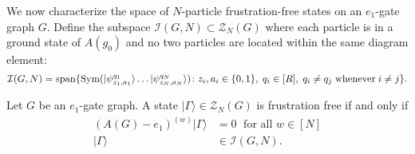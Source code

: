 \documentclass[../thesis-main/thesis-main]{subfiles}
\begin{document}
We now characterize the space of $N$-particle frustration-free states on an $e_{1}$-gate graph $G$. Define the subspace $\mathcal{I}(G,N)\subset\mathcal{Z}_{N}(G)$ where each particle is in a ground state of $A(g_{0})$ and no two particles are located within the same diagram element: 
\begin{equation}
  \mathcal{I}(G,N)=\operatorname{span}\{
  \operatorname{Sym}(|\psi_{z_{1},a_{1}}^{q_{1}}\rangle
  \ldots|\psi_{z_{N},a_{N}}^{q_{N}}\rangle)\colon 
  z_{i},a_{i}\in\{0,1\},\; q_{i}\in[R],\; 
  q_{i}\neq q_{j}\;\text{whenever}\; i\neq j\}.\label{eq:Ign}
\end{equation}

\begin{lemma}\label{lem:FF_characterization}
Let $G$ be an $e_{1}$-gate graph. A state $|\Gamma\rangle\in\mathcal{Z}_{N}(G)$ is frustration free if and only if 
\begin{align}
\left(A(G)-e_{1}\right)^{(w)}|\Gamma\rangle & =0\;\text{ for all }w\in[N]\label{eq:ff_condition1}\\
|\Gamma\rangle & \in\mathcal{I}(G,N).\label{eq:ff_condition2}
\end{align}
\end{lemma}
\end{document}
